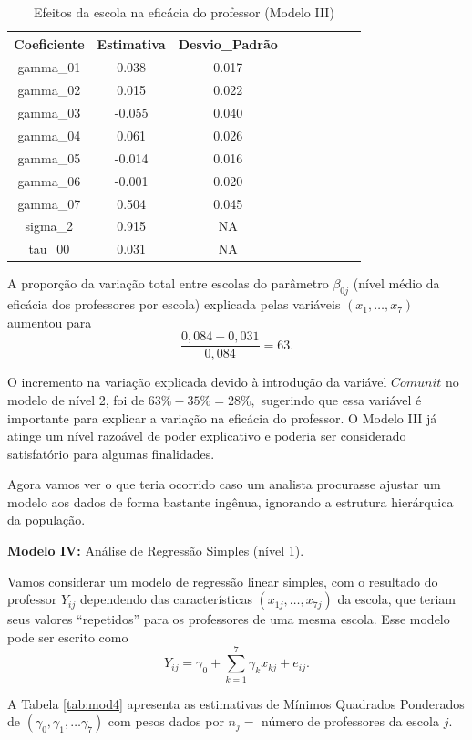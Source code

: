 \documentclass[]{book}
\theoremstyle{definition}
\theoremstyle{definition}
\theoremstyle{definition}
\theoremstyle{remark}
\begin{document}
\begin{table}

\caption{\label{tab:mod3}Efeitos da escola na eficácia do professor (Modelo III)}
\centering
\begin{tabular}[t]{ccccccccc}
\toprule
Coeficiente & Estimativa & Desvio\_Padrão\\
\midrule
gamma\_01 & 0.038 & 0.017\\
gamma\_02 & 0.015 & 0.022\\
gamma\_03 & -0.055 & 0.040\\
gamma\_04 & 0.061 & 0.026\\
gamma\_05 & -0.014 & 0.016\\
\addlinespace
gamma\_06 & -0.001 & 0.020\\
gamma\_07 & 0.504 & 0.045\\
sigma\_2 & 0.915 & NA\\
tau\_00 & 0.031 & NA\\
\bottomrule
\end{tabular}
\end{table}

A proporção da variação total entre escolas do parâmetro \(\beta _{0j}\)
(nível médio da eficácia dos professores por escola) explicada pelas
variáveis \(\left( x_{1},\ldots ,x_{7}\right)\) aumentou para \[
\frac{0,084-0,031}{0,084}=63.
\]

O incremento na variação explicada devido à introdução da variável
\(Comunit\) no modelo de nível 2, foi de \(63\%-35\%=28\%,\) sugerindo
que essa variável é importante para explicar a variação na eficácia do
professor. O Modelo III já atinge um nível razoável de poder explicativo
e poderia ser considerado satisfatório para algumas finalidades.

Agora vamos ver o que teria ocorrido caso um analista procurasse ajustar
um modelo aos dados de forma bastante ingênua, ignorando a estrutura
hierárquica da população.

\textbf{Modelo IV:} Análise de Regressão Simples (nível 1).

Vamos considerar um modelo de regressão linear simples, com o resultado
do professor \(Y_{ij}\) dependendo das características
\(\left(x_{1j},\ldots ,x_{7j}\right)\) da escola, que teriam seus
valores ``repetidos'' para os professores de uma mesma escola. Esse
modelo pode ser escrito como \[
Y_{ij}=\gamma _{0}+\sum\limits_{k=1}^{7}\gamma _{k}x_{kj}+e_{ij}.
\]

A Tabela \ref{tab:mod4} apresenta as estimativas de Mínimos Quadrados
Ponderados de
\(\left(\gamma _{0},\gamma _{1},\ldots \gamma _{7}\right)\) com pesos
dados por \(n_{j}=\) número de professores da escola \(j\).
\end{document}
